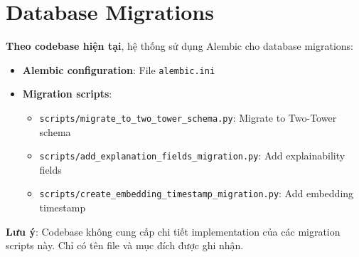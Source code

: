 \section{Database Migrations}

\textbf{Theo codebase hiện tại}, hệ thống sử dụng Alembic cho database migrations:

\begin{itemize}
    \item \textbf{Alembic configuration}: File \texttt{alembic.ini}
    \item \textbf{Migration scripts}:
    \begin{itemize}
        \item \texttt{scripts/migrate\_to\_two\_tower\_schema.py}: Migrate to Two-Tower schema
        \item \texttt{scripts/add\_explanation\_fields\_migration.py}: Add explainability fields
        \item \texttt{scripts/create\_embedding\_timestamp\_migration.py}: Add embedding timestamp
    \end{itemize}
\end{itemize}

\textbf{Lưu ý}: Codebase không cung cấp chi tiết implementation của các migration scripts này. Chỉ có tên file và mục đích được ghi nhận.



